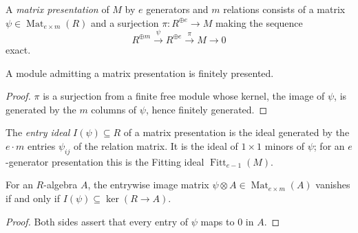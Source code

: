 \begin{definition}
  \label{def:matrix_presentation}
  \leanok
  A \emph{matrix presentation} of \(M\) by \(e\) generators and \(m\)
  relations consists of a matrix
  \(\psi \in \operatorname{Mat}_{e \times m}(R)\) and a surjection
  \(\pi : R^{\oplus e} \to M\) making the sequence
  \[
    R^{\oplus m} \xrightarrow{\ \psi\ } R^{\oplus e}
      \xrightarrow{\ \pi\ } M \to 0
  \]
  exact.
\end{definition}

\begin{lemma}
  \label{lem:matrix_presentation_fp}
  \leanok
  A module admitting a matrix presentation is finitely presented.
\end{lemma}

\begin{proof}
  \leanok
  \(\pi\) is a surjection from a finite free module whose kernel, the image
  of \(\psi\), is generated by the \(m\) columns of \(\psi\), hence finitely
  generated.
\end{proof}

\begin{definition}
  \label{def:entry_ideal}
  \leanok
  The \emph{entry ideal} \(I(\psi) \subseteq R\) of a matrix presentation is
  the ideal generated by the \(e \cdot m\) entries \(\psi_{ij}\) of the
  relation matrix.  It is the ideal of \(1 \times 1\) minors of \(\psi\);
  for an \(e\)-generator presentation this is the Fitting ideal
  \(\operatorname{Fitt}_{e-1}(M)\).
\end{definition}

\begin{lemma}
  \label{lem:entry_ideal_vanish}
  \leanok
  For an \(R\)-algebra \(A\), the entrywise image matrix
  \(\psi \otimes A \in \operatorname{Mat}_{e \times m}(A)\) vanishes if and
  only if \(I(\psi) \subseteq \ker(R \to A)\).
\end{lemma}

\begin{proof}
  \leanok
  Both sides assert that every entry of \(\psi\) maps to \(0\) in \(A\).
\end{proof}

